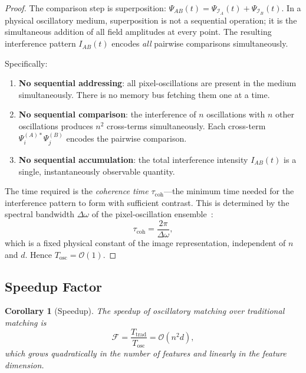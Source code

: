 \documentclass[11pt,twocolumn,a4paper]{article}
\newtheorem{corollary}[theorem]{Corollary}
\newcommand{\BigO}{\mathcal{O}}
\begin{document}
\begin{proof}
The comparison step is superposition: $\Psi_{AB}(t) = \Psi_{\mathcal{I}_A}(t) + \Psi_{\mathcal{I}_B}(t)$. In a physical oscillatory medium, superposition is not a sequential operation; it is the simultaneous addition of all field amplitudes at every point. The resulting interference pattern $I_{AB}(t)$ encodes \emph{all} pairwise comparisons simultaneously.

Specifically:
\begin{enumerate}[label=(\arabic*)]
    \item \textbf{No sequential addressing}: all pixel-oscillations are present in the medium simultaneously. There is no memory bus fetching them one at a time.
    \item \textbf{No sequential comparison}: the interference of $n$ oscillations with $n$ other oscillations produces $n^2$ cross-terms simultaneously. Each cross-term $\Psi_i^{(A)*} \Psi_j^{(B)}$ encodes the pairwise comparison.
    \item \textbf{No sequential accumulation}: the total interference intensity $I_{AB}(t)$ is a single, instantaneously observable quantity.
\end{enumerate}

The time required is the \emph{coherence time} $\tau_{\text{coh}}$---the minimum time needed for the interference pattern to form with sufficient contrast. This is determined by the spectral bandwidth $\Delta\omega$ of the pixel-oscillation ensemble~\citep{mandel1965}:
\begin{equation}
    \tau_{\text{coh}} = \frac{2\pi}{\Delta\omega},
    \label{eq:coherence_time}
\end{equation}
which is a fixed physical constant of the image representation, independent of $n$ and $d$. Hence $T_{\text{osc}} = \BigO(1)$.
\end{proof}

\subsection{Speedup Factor}

\begin{corollary}[Speedup]\label{cor:speedup}
The speedup of oscillatory matching over traditional matching is
\begin{equation}
    \mathcal{F} = \frac{T_{\text{trad}}}{T_{\text{osc}}} = \BigO(n^2 d),
    \label{eq:speedup}
\end{equation}
which grows quadratically in the number of features and linearly in the feature dimension.
\end{corollary}
\end{document}
